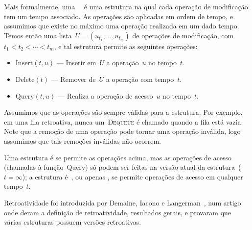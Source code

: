 \documentclass[quali.tex]{subfile}
\begin{document}
Mais formalmente, uma~~\cite{DemaineIL2007} é uma estrutura na qual cada operação de modificação tem um tempo associado. As operações são aplicadas em ordem de tempo, e assumimos que existe no máximo uma operação realizada em um dado tempo. Temos então uma lista~${U = (u_{t_1}, \ldots, u_{t_m})}$ de operações de modificação, com~${t_1 < t_2 < \cdots < t_m}$, e tal estrutura permite as seguintes operações:

\begin{itemize}
	\item $\text{Insert}(t, u)$ --- Inserir em~$U$ a operação~$u$ no tempo~$t$.
	\item $\text{Delete}(t)$ --- Remover de~$U$ a operação com tempo~$t$.
	\item $\text{Query}(t, u)$ --- Realiza a operação de acesso~$u$ no tempo~$t$.
\end{itemize}

Assumimos que as operações são sempre válidas para a estrutura. Por exemplo, em uma fila retroativa, nunca um~\textsc{Dequeue} é chamado quando a fila está vazia. Note que a remoção de uma operação pode tornar uma operação inválida, logo assumimos que tais remoções inválidas não ocorrem.

Uma estrutura é  se permite as operações acima, mas as operações de acesso (chamadas à função~Query) só podem ser feitas na versão atual da estrutura~(${t = \infty}$); a estrutura é~, ou apenas , se permite operações de acesso em qualquer tempo~$t$.

Retroatividade foi introduzida por Demaine, Iacono e Langerman~\cite{DemaineIL2007}, num artigo onde deram a definição de retroatividade, resultados gerais, e provaram que várias estruturas possuem versões retroativas.
\end{document}
